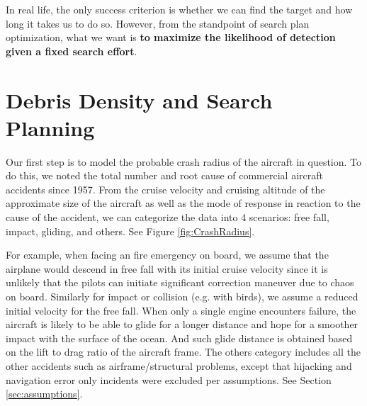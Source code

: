 \documentclass[12pt, letterpaper]{article}  %
\theoremstyle{definition}
\theoremstyle{remark}
\theoremstyle{plain}
\begin{document}
In real life, the only success criterion is whether we can find the target and how long it takes us to do so. However, from the standpoint of search plan optimization, what we want is \textbf{to maximize the likelihood of detection given a fixed search effort}.


\section{Debris Density and Search Planning}\label{sec:mainmethod}


Our first step is to model the probable crash radius of the aircraft in question. To do this, we noted the total number and root cause of commercial aircraft accidents since 1957. From the cruise velocity and cruising altitude of the approximate size of the aircraft as well as the mode of response in reaction to the cause of the accident, we can categorize the data into 4 scenarios: free fall, impact, gliding, and others. See Figure \ref{fig:CrashRadius}.

For example, when facing an fire emergency on board, we assume that the airplane would descend in free fall with its initial cruise velocity since it is unlikely that the pilots can initiate significant correction maneuver due to chaos on board. Similarly for impact or collision (e.g. with birds), we assume a reduced initial velocity for the free fall. When only a single engine encounters failure, the aircraft is likely to be able to glide for a longer distance and hope for a smoother impact with the surface of the ocean. And such glide distance is obtained based on the lift to drag ratio of the aircraft frame. The others category includes all the other accidents such as airframe/structural problems, except that hijacking and navigation error only incidents were excluded per assumptions. See Section \ref{sec:assumptions}.
\end{document}
